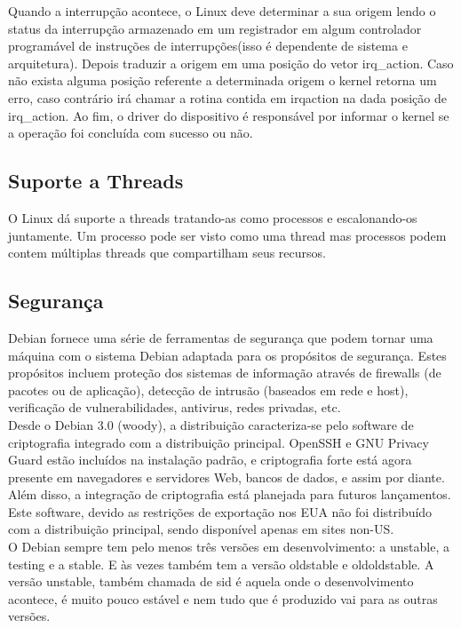 \documentclass[conference]{IEEEtran}
\begin{document}
Quando a interrupção acontece, o Linux deve determinar a sua origem lendo o status da interrupção armazenado em um registrador em algum controlador programável de instruções de interrupções(isso é dependente de sistema e arquitetura). Depois traduzir a origem em uma posição do vetor irq\_action. Caso não exista alguma posição referente a determinada origem o kernel retorna um erro, caso contrário irá chamar a rotina contida em irqaction na dada posição de irq\_action. Ao fim, o driver do dispositivo é responsável por informar o kernel se a operação foi concluída com sucesso ou não\cite{InterruptsLinux}.
\subsection{Suporte a Threads}\label{sec:LinuxThreads}
O Linux dá suporte a threads tratando-as como processos e escalonando-os juntamente. Um processo pode ser visto como uma thread mas
processos podem contem múltiplas threads que compartilham seus recursos\cite{LinuxSchedulerIBM}.
\subsection{Segurança}\label{sec:LinuxSec}
Debian fornece uma série de ferramentas de segurança que podem tornar uma máquina com o sistema Debian adaptada para os propósitos de segurança. Estes propósitos incluem proteção dos sistemas de informação através de firewalls (de pacotes ou de aplicação), detecção de intrusão (baseados em rede e host), verificação de vulnerabilidades, antivirus, redes privadas, etc\cite{SegLinux}.\\

Desde o Debian 3.0 (woody), a distribuição caracteriza-se pelo software de criptografia integrado com a distribuição principal. OpenSSH e GNU Privacy Guard estão incluídos na instalação padrão, e criptografia forte está agora presente em navegadores e servidores Web, bancos de dados, e assim por diante. Além disso, a integração de criptografia está planejada para futuros lançamentos. Este software, devido as restrições de exportação nos EUA não foi distribuído com a distribuição principal, sendo disponível apenas em sites non-US.\cite{SegLinux}\\

O Debian sempre tem pelo menos três versões em desenvolvimento: a unstable, a testing e a stable. E às vezes também tem a versão oldstable e oldoldstable. A versão unstable, também chamada de sid é aquela onde o desenvolvimento acontece, é muito pouco estável e nem tudo que é produzido vai para as outras versões.\\
\end{document}
